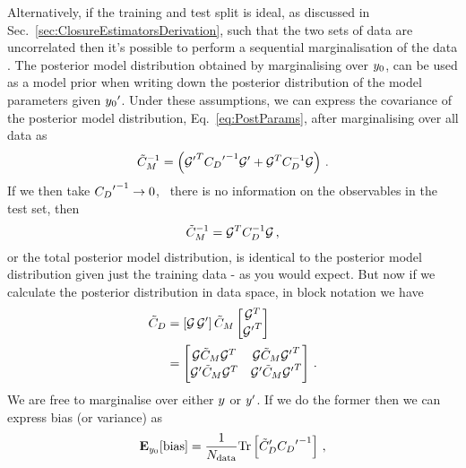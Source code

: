 Alternatively, if the training and test split is ideal, as discussed in
Sec.~\ref{sec:ClosureEstimatorsDerivation}, such that the two sets of data
are uncorrelated then it's possible to perform a sequential marginalisation of
the data \cite{tarantola}. The posterior model distribution obtained by
marginalising over $y_0$, can be used as a model prior when
writing down the posterior distribution of the model parameters given
${{y_0}^{\prime}}$. Under these assumptions, we can express the
covariance of the posterior model distribution, Eq.~\ref{eq:PostParams},
after marginalising over all data as
\begin{equation}
    \tilde{C}_M^{-1} = \left(
        {{\mathcal{G}}^{\prime}}^T {{C_{D}}^{\prime}}^{-1} {{\mathcal{G}}^{\prime}} + 
        \mathcal{G}^T C_{D}^{-1} \mathcal{G}
    \right) \, .
\end{equation}
If we then take ${{C_{D}}^{\prime}}^{-1} \to 0$, \ie\ there is no information
on the observables in the test set, then
\begin{equation}
    \tilde{C}_M^{-1} = \mathcal{G}^T C_{D}^{-1} \mathcal{G} \, ,
\end{equation}
or the total posterior model distribution, is identical to the posterior model
distribution given just the training data - as you would expect. But now if
we calculate the posterior distribution in data space, in block notation we have
\begin{equation}
    \begin{split}
        \tilde{C}_D &= \left[ \mathcal{G} \, {{\mathcal{G}}^{\prime}} \right] \tilde{C}_M
        \begin{bmatrix}
            \mathcal{G}^T \\
            {{\mathcal{G}}^{\prime}}^T
        \end{bmatrix}
        \\
        &=
        \begin{bmatrix}
            \mathcal{G} \tilde{C}_M \mathcal{G}^T & \mathcal{G} \tilde{C}_M {{\mathcal{G}}^{\prime}}^T \\
            {{\mathcal{G}}^{\prime}} \tilde{C}_M \mathcal{G}^T & {{\mathcal{G}}^{\prime}} \tilde{C}_M {{\mathcal{G}}^{\prime}}^T
        \end{bmatrix} \, .
    \end{split}
\end{equation}
We are free to marginalise over either $y$ or ${{y}^{\prime}}$. If we do the
former then we can express bias (or variance) as
\begin{equation}
    \mathbf{E}_{y_0}[{\rm bias}] = \frac{1}{N_{\rm data}}
    {\rm Tr} \left[
        {{\tilde{C}_D}^{\prime}}
        {{C_{D}}^{\prime}}^{-1}
    \right] \, ,
\end{equation}
